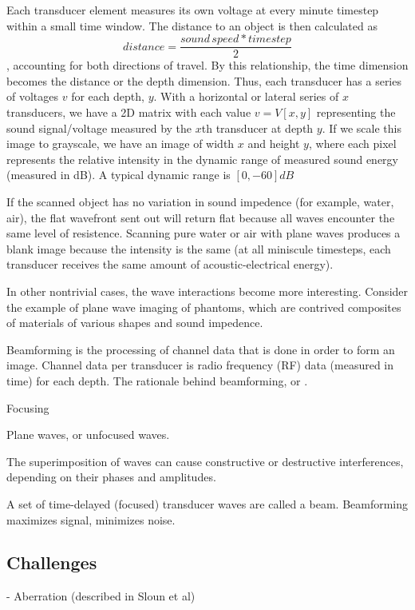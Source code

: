  Each transducer element measures its own voltage at every minute timestep within a small time window. The distance to an object is then calculated as $$distance = \frac{sound\,speed * timestep}{2}$$, accounting for both directions of travel. By this relationship, the time dimension becomes the distance or the depth dimension. Thus, each transducer has a series of voltages $v$ for each depth, $y$. With a horizontal or lateral series of $x$ transducers, we have a 2D matrix with each value $v = V[x, y]$ representing the sound signal/voltage measured by the $x$th transducer at depth $y$. If we scale this image to grayscale, we have an image of width $x$ and height $y$, where each pixel represents the relative intensity in the dynamic range of measured sound energy (measured in dB). A typical dynamic range is $[0, -60]dB$

 If the scanned object has no variation in sound impedence (for example, water, air), the flat wavefront sent out will return flat because all waves encounter the same level of resistence. Scanning pure water or air with plane waves produces a blank image because the intensity is the same (at all miniscule timesteps, each transducer receives the same amount of acoustic-electrical energy).

 In other nontrivial cases, the wave interactions become more interesting. Consider the example of plane wave imaging of phantoms, which are contrived composites of materials of various shapes and sound impedence.

 Beamforming is the processing of channel data that is done in order to form an image. Channel data per transducer is radio frequency (RF) data (measured in time) for each depth. The rationale behind beamforming, or .

 Focusing


 Plane waves, or unfocused waves.

 The superimposition of waves can cause constructive or destructive interferences, depending on their phases and amplitudes.

 A set of time-delayed (focused) transducer waves are called a beam. Beamforming maximizes signal, minimizes noise.

%

\subsection{Challenges}
- Aberration (described in Sloun et al)


